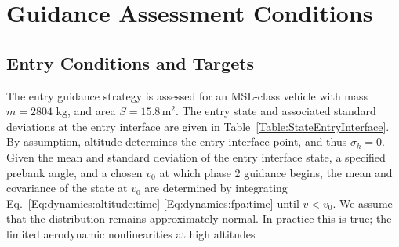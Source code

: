 \chapter{Guidance Assessment Conditions}\label{Ch:AssessmentConditions}

\section{Entry Conditions and Targets}
The entry guidance strategy is assessed for an MSL-class vehicle with mass $m = 2804$ kg, and area $S = 15.8\, \mathrm{m}^2$. The entry state and associated standard deviations at the entry interface are given in Table~\ref{Table:StateEntryInterface}. By assumption, altitude determines the entry interface point, and thus $\sigma_h = 0$. Given the mean and standard deviation of the entry interface state, a specified prebank angle, and a chosen $v_0$ at which phase 2 guidance begins, the mean and covariance of the state at  $v_0$ are determined by integrating Eq.~\eqref{Eq:dynamics:altitude:time}-\eqref{Eq:dynamics:fpa:time} until $v<v_0$. We assume that the distribution remains approximately normal. In practice this is true; the limited aerodynamic nonlinearities at high altitudes

